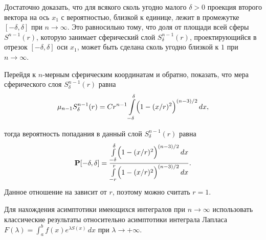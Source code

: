 \begin{remark}
Достаточно доказать, что для всякого сколь угодно малого $\delta>0$ проекция второго вектора на ось $x_1$ с вероятностью, близкой к 
единице, лежит в промежутке $[-\delta, \delta]$ при $n\to\infty$. Это равносильно тому, что доля от площади всей сферы $S^{n-1}(r)$, 
которую занимает сферический слой $S^{n-1}_{\delta}(r)$, проектирующийся в отрезок $[-\delta, \delta]$ оси $x_1$, 
может быть сделана сколь угодно близкой к $1$ при $n\to\infty$. 

Перейдя к $n$-мерным сферическим координатам и обратно, показать, что мера сферического слоя $S^{n-1}_{\delta}(r)$ равна 
$$
\mu_{n-1} S_{\delta}^{n-1}(r) = Cr^{n-1} 
\int\limits_{-\delta}^{\delta} \Bigl( 1-(x/r)^2\Bigr)^{(n-3)/2} \, dx ,
$$

тогда вероятность попадания в данный слой $S_{\delta}^{n-1}(r)$ равна 
$$
{\mathbf P}[-\delta, \delta]=\frac{\int\limits_{-\delta}^{\delta} \Bigl( 1-(x/r)^2\Bigr)^{(n-3)/2} \, dx}
{\int\limits_{-r}^{r} \Bigl( 1-(x/r)^2\Bigr)^{(n-3)/2} \, dx} . 
$$
Данное отношение на зависит от $r$, поэтому можно считать $r=1$. 

Для нахождения асимптотики имеющихся интегралов при $n\to\infty$ использовать классические результаты относительно асимптотики интеграла 
Лапласа $F(\lambda)=\int_a^b f(x)e^{\lambda S(x)}\, dx$ при $\lambda\to +\infty$. %

\end{remark}

